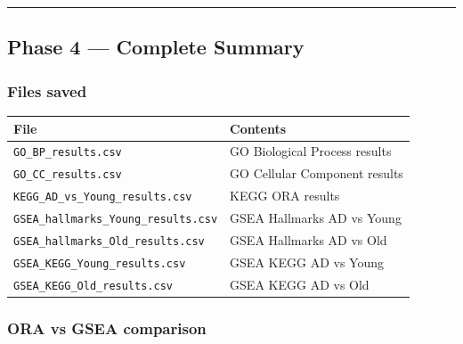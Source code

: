 \documentclass[
]{article}
\begin{document}
\begin{center}\rule{0.5\linewidth}{0.5pt}\end{center}

\subsection{Phase 4 --- Complete
Summary}\label{phase-4-complete-summary}

\subsubsection{Files saved}\label{files-saved-1}

\begin{longtable}[]{@{}ll@{}}
\toprule\noalign{}
File & Contents \\
\midrule\noalign{}
\endhead
\bottomrule\noalign{}
\endlastfoot
\texttt{GO\_BP\_results.csv} & GO Biological Process results \\
\texttt{GO\_CC\_results.csv} & GO Cellular Component results \\
\texttt{KEGG\_AD\_vs\_Young\_results.csv} & KEGG ORA results \\
\texttt{GSEA\_hallmarks\_Young\_results.csv} & GSEA Hallmarks AD vs
Young \\
\texttt{GSEA\_hallmarks\_Old\_results.csv} & GSEA Hallmarks AD vs Old \\
\texttt{GSEA\_KEGG\_Young\_results.csv} & GSEA KEGG AD vs Young \\
\texttt{GSEA\_KEGG\_Old\_results.csv} & GSEA KEGG AD vs Old \\
\end{longtable}

\subsubsection{ORA vs GSEA comparison}\label{ora-vs-gsea-comparison}
\end{document}
